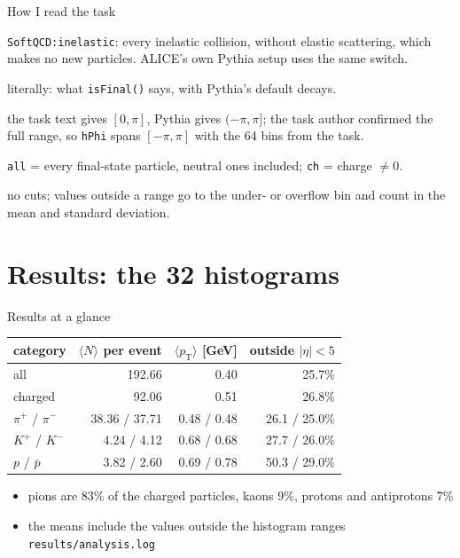 \documentclass[aspectratio=169,11pt]{beamer}
\newcommand{\pt}{\ensuremath{p_\mathrm{T}}}
\newcommand{\pbar}{\ensuremath{\bar{p}}}
\begin{document}
\begin{frame}{How I read the task}
  \small
  \begin{description}
    \item[Minimum bias] \texttt{SoftQCD:inelastic}: every inelastic collision, without elastic scattering,
      which makes no new particles. ALICE's own Pythia setup uses the same switch.
    \item[Final state] literally: what \texttt{isFinal()} says, with Pythia's default decays.
    \item[$\phi$ range] the task text gives $[0, \pi]$, Pythia gives $(-\pi, \pi]$; the task author
      confirmed the full range, so \texttt{hPhi} spans $[-\pi, \pi]$ with the 64 bins from the task.
    \item[\texttt{all} and \texttt{ch}] \texttt{all} = every final-state particle, neutral ones included;
      \texttt{ch} = charge $\neq 0$.
    \item[Nothing is thrown away] no cuts; values outside a range go to the under- or overflow bin and
      count in the mean and standard deviation.
  \end{description}
\end{frame}

\section{Results: the 32 histograms}

\begin{frame}{Results at a glance}
  \centering
  \begin{tabular}{lrrr}
    \toprule
    category & $\langle N\rangle$ per event & $\langle\pt\rangle$ [GeV] & outside $|\eta| < 5$ \\
    \midrule
    all               & 192.66 & 0.40 & 25.7\% \\
    charged           & 92.06  & 0.51 & 26.8\% \\
    $\pi^+$ / $\pi^-$ & 38.36 / 37.71 & 0.48 / 0.48 & 26.1 / 25.0\% \\
    $K^+$ / $K^-$     & 4.24 / 4.12   & 0.68 / 0.68 & 27.7 / 26.0\% \\
    $p$ / \pbar       & 3.82 / 2.60   & 0.69 / 0.78 & 50.3 / 29.0\% \\
    \bottomrule
  \end{tabular}

  \vspace{1em}
  \raggedright
  \begin{itemize}
    \item pions are 83\% of the charged particles, kaons 9\%, protons and antiprotons 7\%
    \item the means include the values outside the histogram ranges
          \hfill{\scriptsize\texttt{results/analysis.log}}
  \end{itemize}
\end{frame}
\end{document}
